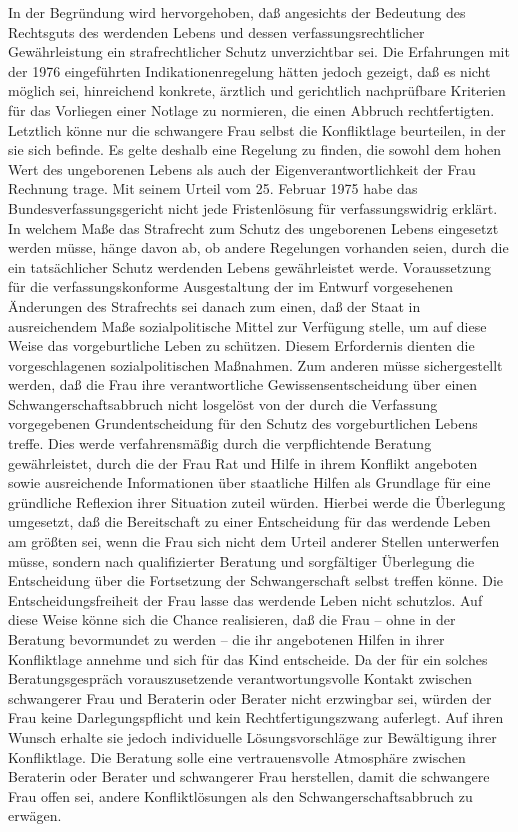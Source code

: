 \documentclass[12pt]{article}
\begin{document}
\begin{sourcepara}[title={原文理由 A.II.2.a 理由}]
In der Begründung wird hervorgehoben, daß angesichts der Bedeutung des Rechtsguts des werdenden Lebens und dessen verfassungsrechtlicher Gewährleistung ein strafrechtlicher Schutz unverzichtbar sei. Die Erfahrungen mit der 1976 eingeführten Indikationenregelung hätten jedoch gezeigt, daß es nicht möglich sei, hinreichend konkrete, ärztlich und gerichtlich nachprüfbare Kriterien für das Vorliegen einer Notlage zu normieren, die einen Abbruch rechtfertigten. Letztlich könne nur die schwangere Frau selbst die Konfliktlage beurteilen, in der sie sich befinde. Es gelte deshalb eine Regelung zu finden, die sowohl dem hohen Wert des ungeborenen Lebens als auch der Eigenverantwortlichkeit der Frau Rechnung trage. Mit seinem Urteil vom 25. Februar 1975 habe das Bundesverfassungsgericht nicht jede Fristenlösung für verfassungswidrig erklärt. In welchem Maße das Strafrecht zum Schutz des ungeborenen Lebens eingesetzt werden müsse, hänge davon ab, ob andere Regelungen vorhanden seien, durch die ein tatsächlicher Schutz werdenden Lebens gewährleistet werde. Voraussetzung für die verfassungskonforme Ausgestaltung der im Entwurf vorgesehenen Änderungen des Strafrechts sei danach zum einen, daß der Staat in ausreichendem Maße sozialpolitische Mittel zur Verfügung stelle, um auf diese Weise das vorgeburtliche Leben zu schützen. Diesem Erfordernis dienten die vorgeschlagenen sozialpolitischen Maßnahmen. Zum anderen müsse sichergestellt werden, daß die Frau ihre verantwortliche Gewissensentscheidung über einen Schwangerschaftsabbruch nicht losgelöst von der durch die Verfassung vorgegebenen Grundentscheidung für den Schutz des vorgeburtlichen Lebens treffe. Dies werde verfahrensmäßig durch die verpflichtende Beratung gewährleistet, durch die der Frau Rat und Hilfe in ihrem Konflikt angeboten sowie ausreichende Informationen über staatliche Hilfen als Grundlage für eine gründliche Reflexion ihrer Situation zuteil würden. Hierbei werde die Überlegung umgesetzt, daß die Bereitschaft zu einer Entscheidung für das werdende Leben am größten sei, wenn die Frau sich nicht dem Urteil anderer Stellen unterwerfen müsse, sondern nach qualifizierter Beratung und sorgfältiger Überlegung die Entscheidung über die Fortsetzung der Schwangerschaft selbst treffen könne. Die Entscheidungsfreiheit der Frau lasse das werdende Leben nicht schutzlos. Auf diese Weise könne sich die Chance realisieren, daß die Frau -- ohne in der Beratung bevormundet zu werden -- die ihr angebotenen Hilfen in ihrer Konfliktlage annehme und sich für das Kind entscheide. Da der für ein solches Beratungsgespräch vorauszusetzende verantwortungsvolle Kontakt zwischen schwangerer Frau und Beraterin oder Berater nicht erzwingbar sei, würden der Frau keine Darlegungspflicht und kein Rechtfertigungszwang auferlegt. Auf ihren Wunsch erhalte sie jedoch individuelle Lösungsvorschläge zur Bewältigung ihrer Konfliktlage. Die Beratung solle eine vertrauensvolle Atmosphäre zwischen Beraterin oder Berater und schwangerer Frau herstellen, damit die schwangere Frau offen sei, andere Konfliktlösungen als den Schwangerschaftsabbruch zu erwägen.
\end{sourcepara}
\end{document}
